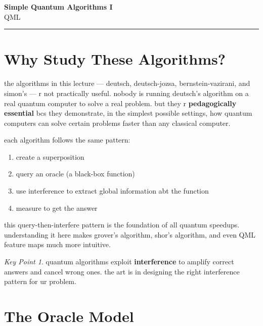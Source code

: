 \documentclass[11pt,a4paper]{article}
\theoremstyle{definition}
\theoremstyle{remark}
\newtheorem*{keypoint}{Key Point}
\begin{document}
\begin{center}
    {\LARGE \textbf{Simple Quantum Algorithms I}}\\[8pt]
    {\large QML}\\[12pt]
    \hrule
\end{center}

\vspace{12pt}
\tableofcontents
\newpage

\section{Why Study These Algorithms?}

the algorithms in this lecture --- deutsch, deutsch-jozsa, bernstein-vazirani, and simon's --- r not practically useful. nobody is running deutsch's algorithm on a real quantum computer to solve a real problem. but they r \textbf{pedagogically essential} bcs they demonstrate, in the simplest possible settings, how quantum computers can solve certain problems faster than any classical computer.

each algorithm follows the same pattern:
\begin{enumerate}
    \item create a superposition
    \item query an oracle (a black-box function)
    \item use interference to extract global information abt the function
    \item measure to get the answer
\end{enumerate}

this query-then-interfere pattern is the foundation of all quantum speedups. understanding it here makes grover's algorithm, shor's algorithm, and even QML feature maps much more intuitive.

\begin{keypoint}
quantum algorithms exploit \textbf{interference} to amplify correct answers and cancel wrong ones. the art is in designing the right interference pattern for ur problem.
\end{keypoint}

\section{The Oracle Model}
\end{document}
